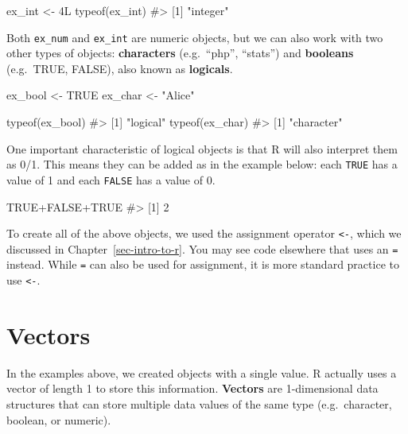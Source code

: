 \documentclass[
  letterpaper,
]{krantz}
\makeatletter
\newenvironment{Shaded}{\begin{snugshade}}{\end{snugshade}}
\newcommand{\CommentTok}[1]{\textcolor[rgb]{0.37,0.37,0.37}{#1}}
\newcommand{\ConstantTok}[1]{\textcolor[rgb]{0.56,0.35,0.01}{#1}}
\newcommand{\DecValTok}[1]{\textcolor[rgb]{0.68,0.00,0.00}{#1}}
\newcommand{\FunctionTok}[1]{\textcolor[rgb]{0.28,0.35,0.67}{#1}}
\newcommand{\NormalTok}[1]{\textcolor[rgb]{0.00,0.23,0.31}{#1}}
\newcommand{\OtherTok}[1]{\textcolor[rgb]{0.00,0.23,0.31}{#1}}
\newcommand{\SpecialCharTok}[1]{\textcolor[rgb]{0.37,0.37,0.37}{#1}}
\newcommand{\StringTok}[1]{\textcolor[rgb]{0.13,0.47,0.30}{#1}}
\newenvironment{kframe}{%
\medskip{}
\setlength{\fboxsep}{.8em}
 \def\at@end@of@kframe{}%
 \ifinner\ifhmode%
  \def\at@end@of@kframe{\end{minipage}}%
  \begin{minipage}{\columnwidth}%
 \fi\fi%
 \def\FrameCommand##1{\hskip\@totalleftmargin \hskip-\fboxsep
 \colorbox{shadecolor}{##1}\hskip-\fboxsep
     \hskip-\linewidth \hskip-\@totalleftmargin \hskip\columnwidth}%
 \MakeFramed {\advance\hsize-\width
   \@totalleftmargin\z@ \linewidth\hsize
   \@setminipage}}%
 {\par\unskip\endMakeFramed%
 \at@end@of@kframe}
\renewenvironment{Shaded}{\begin{kframe}}{\end{kframe}}
\makeatother
\begin{document}
\begin{Shaded}
\begin{Highlighting}[]
\NormalTok{ex\_int }\OtherTok{\textless{}{-}} \DecValTok{4}\NormalTok{L}
\FunctionTok{typeof}\NormalTok{(ex\_int)}
\CommentTok{\#\textgreater{} [1] "integer"}
\end{Highlighting}
\end{Shaded}

Both \texttt{ex\_num} and \texttt{ex\_int} are numeric objects, but we
can also work with two other types of objects: \textbf{characters}
(e.g.~``php'', ``stats'') and \textbf{booleans} (e.g.~TRUE, FALSE), also
known as \textbf{logicals}.

\begin{Shaded}
\begin{Highlighting}[]
\NormalTok{ex\_bool }\OtherTok{\textless{}{-}} \ConstantTok{TRUE}
\NormalTok{ex\_char }\OtherTok{\textless{}{-}} \StringTok{"Alice"}

\FunctionTok{typeof}\NormalTok{(ex\_bool)}
\CommentTok{\#\textgreater{} [1] "logical"}
\FunctionTok{typeof}\NormalTok{(ex\_char)}
\CommentTok{\#\textgreater{} [1] "character"}
\end{Highlighting}
\end{Shaded}

One important characteristic of logical objects is that R will also
interpret them as 0/1. This means they can be added as in the example
below: each \texttt{TRUE} has a value of 1 and each \texttt{FALSE} has a
value of 0.

\begin{Shaded}
\begin{Highlighting}[]
\ConstantTok{TRUE}\SpecialCharTok{+}\ConstantTok{FALSE}\SpecialCharTok{+}\ConstantTok{TRUE}
\CommentTok{\#\textgreater{} [1] 2}
\end{Highlighting}
\end{Shaded}

To create all of the above objects, we used the assignment operator
\texttt{\textless{}-}, which we discussed in
Chapter~\ref{sec-intro-to-r}. You may see code elsewhere that uses an
\texttt{=} instead. While \texttt{=} can also be used for assignment, it
is more standard practice to use \texttt{\textless{}-}.

\section{Vectors}\label{vectors}

In the examples above, we created objects with a single value. R
actually uses a vector of length 1 to store this information.
\textbf{Vectors} are 1-dimensional data structures that can store
multiple data values of the same type (e.g.~character, boolean, or
numeric).
\end{document}
